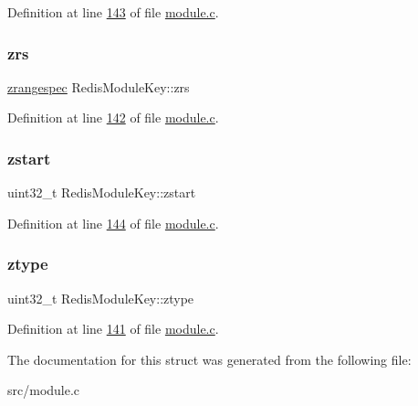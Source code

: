Definition at line \hyperlink{module_8c_source_l00143}{143} of file \hyperlink{module_8c_source}{module.\+c}.

\mbox{\label{structRedisModuleKey_a6ca39419325563f7dd5fff34a06ed09b}} 
\subsubsection{\texorpdfstring{zrs}{zrs}}
{\footnotesize\ttfamily \hyperlink{structzrangespec}{zrangespec} Redis\+Module\+Key\+::zrs}



Definition at line \hyperlink{module_8c_source_l00142}{142} of file \hyperlink{module_8c_source}{module.\+c}.

\mbox{\label{structRedisModuleKey_a1bc364a77c47165b820c4fc74599808f}} 
\subsubsection{\texorpdfstring{zstart}{zstart}}
{\footnotesize\ttfamily uint32\+\_\+t Redis\+Module\+Key\+::zstart}



Definition at line \hyperlink{module_8c_source_l00144}{144} of file \hyperlink{module_8c_source}{module.\+c}.

\mbox{\label{structRedisModuleKey_a7ddf074f86265566c7a0592deb1dd30e}} 
\subsubsection{\texorpdfstring{ztype}{ztype}}
{\footnotesize\ttfamily uint32\+\_\+t Redis\+Module\+Key\+::ztype}



Definition at line \hyperlink{module_8c_source_l00141}{141} of file \hyperlink{module_8c_source}{module.\+c}.



The documentation for this struct was generated from the following file\+:\begin{DoxyCompactItemize}
\item 
src/module.\+c\end{DoxyCompactItemize}
